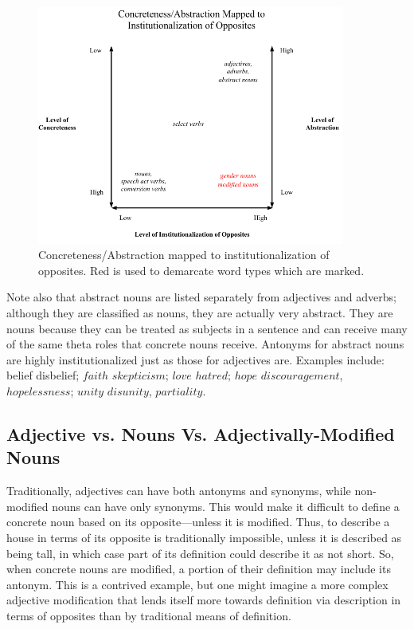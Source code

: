 	\begin{figure}[here]
		\centering
		\includegraphics[width=0.9\textwidth]{images/Diagram.png}
		\caption{Concreteness/Abstraction mapped to institutionalization of opposites.  Red is used to demarcate word types which are marked.}
		\label{fig:introFig}
	\end{figure}
	
Note also that abstract nouns are listed separately from adjectives and adverbs; although they are classified as nouns, they are actually very abstract.  They are nouns because they can be treated as subjects in a sentence and can receive many of the same theta roles that concrete nouns receive.  
Antonyms for abstract nouns are highly institutionalized just as those for adjectives are.  Examples include: belief \opp disbelief; $faith$ \opp $skepticism$; $love$ \opp $hatred$; $hope$ \opp $discouragement$, $hopelessness$; $unity$ \opp $disunity$, $partiality$.

\subsection {Adjective vs. Nouns Vs. Adjectivally-Modified Nouns}  Traditionally, adjectives can have both antonyms and synonyms, while non-modified nouns can have only synonyms.  This would make it difficult to define a concrete noun based on its opposite—unless it is modified.  Thus, to describe a house in terms of its opposite is traditionally impossible, unless it is described as being tall, in which case part of its definition could describe it as not short.  So, when concrete nouns are modified, a portion of their definition may include its antonym.  This is a contrived example, but one might imagine a more complex adjective modification that lends itself more towards definition via description in terms of opposites than by traditional means of definition.  

